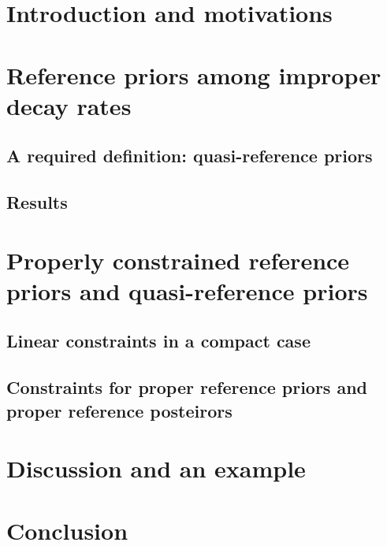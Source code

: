 
\section{Introduction and motivations}



\section{Reference priors among improper decay rates}

    \subsection{A required definition: quasi-reference priors}


    \subsection{Results}


\section{Properly constrained reference priors and quasi-reference priors}

    \subsection{Linear constraints in a compact case}

    \subsection{Constraints for proper reference priors and proper reference posteirors}


\section{Discussion and an example}


\section{Conclusion}








